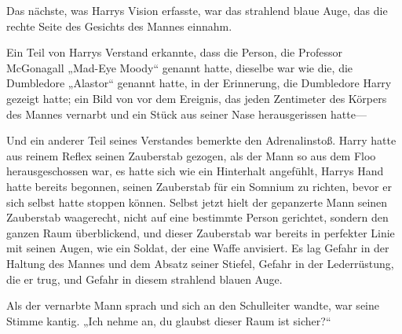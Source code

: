 Das nächste, was Harrys Vision erfasste, war das strahlend blaue Auge, das die rechte Seite des Gesichts des Mannes einnahm.

Ein Teil von Harrys Verstand erkannte, dass die Person, die Professor McGonagall „Mad-Eye Moody“ genannt hatte, dieselbe war wie die, die Dumbledore „Alastor“ genannt hatte, in der Erinnerung, die Dumbledore Harry gezeigt hatte; ein Bild von vor dem Ereignis, das jeden Zentimeter des Körpers des Mannes vernarbt und ein Stück aus seiner Nase herausgerissen hatte—

Und ein anderer Teil seines Verstandes bemerkte den Adrenalinstoß. Harry hatte aus reinem Reflex seinen Zauberstab gezogen, als der Mann so aus dem Floo herausgeschossen war, es hatte sich wie ein Hinterhalt angefühlt, Harrys Hand hatte bereits begonnen, seinen Zauberstab für ein Somnium zu richten, bevor er sich selbst hatte stoppen können.
Selbst jetzt hielt der gepanzerte Mann seinen Zauberstab waagerecht, nicht auf eine bestimmte Person gerichtet, sondern den ganzen Raum überblickend, und dieser Zauberstab war bereits in perfekter Linie mit seinen Augen, wie ein Soldat, der eine Waffe anvisiert. Es lag Gefahr in der Haltung des Mannes und dem Absatz seiner Stiefel, Gefahr in der Lederrüstung, die er trug, und Gefahr in diesem strahlend blauen Auge.

Als der vernarbte Mann sprach und sich an den Schulleiter wandte, war seine Stimme kantig. „Ich nehme an, du glaubst dieser Raum ist sicher?“

